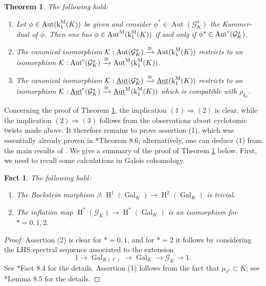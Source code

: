 \documentclass[11pt]{amsart}
\newtheorem{theorem}[proposition]{Theorem}
\newtheorem{fact}[proposition]{Fact}
\theoremstyle{definition}
\theoremstyle{remark}
\numberwithin{equation}{section}
\DeclareMathOperator{\Aut}{Aut}
\DeclareMathOperator{\Gal}{Gal}
\renewcommand{\H}{\operatorname{H}}
\newcommand{\Gc}{\mathcal{G}}
\newcommand{\Kummer}{\mathcal{K}}
\newcommand{\Autm}{\Aut^{\rm M}}
\newcommand{\Autc}{\Aut^{\rm c}}
\newcommand{\UAut}{\underline{\Aut}}
\newcommand{\UAutc}{\underline{\Aut}^{\rm c}}
\newcommand{\UAutm}{\underline{\Aut}^{\rm M}}
\renewcommand{\k}{\operatorname{k}^{\rm M}}
\begin{document}
\begin{theorem}
\label{theorem: cohom / kummer / galois-to-milnor}
  The following hold:
  \begin{enumerate}
    \item Let $\phi \in \Aut(\k_1(K))$ be given and consider $\phi^* \in \Aut(\Gc_K^a)$ the Kummer-dual of $\phi$.
    Then one has $\phi \in \Autm(\k_1(K))$ if and only if $\phi^* \in \Autc(\Gc_K^a)$.
    \item The canonical isomorphism $\Kummer : \Aut(\Gc_K^a) \xrightarrow{\cong} \Aut(\k_1(K))$ restricts to an isomorphism $\Kummer : \Autc(\Gc_K^a) \xrightarrow{\cong} \Autm(\k_1(K))$.
    \item The canonical isomorphism $\Kummer : \UAut(\Gc_K^a) \xrightarrow{\cong} \UAut(\k_1(K))$ restricts to an isomorphism $\Kummer : \UAutc(\Gc_K^a) \xrightarrow{\cong} \UAutm(\k_1(K))$ which is compatible with $\rho_{k_0}$.
  \end{enumerate}
\end{theorem}
Concerning the proof of Theorem \ref{theorem: cohom / kummer / galois-to-milnor}, the implication $(1) \Rightarrow (2)$ is clear, while the implication $(2) \Rightarrow (3)$ follows from the observations about cyclotomic twists made above.
It therefore remains to prove assertion (1), which was essentially already proven in \cite{Topaz:2014}*{Theorem 8.6}; alternatively, one can deduce (1) from the main results of \cite{Topaz:2015b}.
We give a summary of the proof of Theorem \ref{theorem: cohom / kummer / galois-to-milnor} below.
First, we need to recall some calculations in Galois cohomology.

\begin{fact}
\label{fact: cohom / kummer / generalities-kummer}
  The following hold:
  \begin{enumerate}
    \item The Bockstein morphism $\beta : \H^1(\Gal_K) \rightarrow \H^2(\Gal_K)$ is trivial.
    \item The inflation map $\H^*(\Gc_K) \rightarrow \H^*(\Gal_K)$ is an isomorphism for $* = 0,1,2$.
  \end{enumerate}
\end{fact}
\begin{proof}
  Assertion (2) is clear for $* = 0,1$, and for $* = 2$ it follows by considering the LHS spectral sequence associated to the extension
  \[ 1 \rightarrow \Gal_{K(\ell)} \rightarrow \Gal_K \rightarrow \Gc_K \rightarrow 1. \]
  See \cite{Topaz:2014}*{Fact 8.4} for the details.
  Assertion (1) follows from the fact that $\mu_{\ell^2} \subset K$; see \cite{Topaz:2014}*{Lemma 8.5} for the details.
\end{proof}
\end{document}
